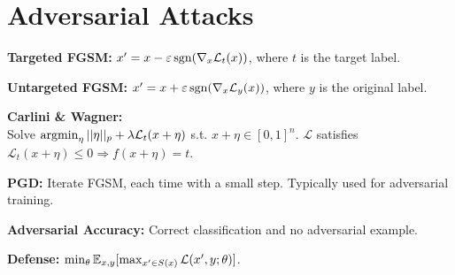 \section{Adversarial Attacks}
\textbf{Targeted FGSM:} $x^\prime = x - \varepsilon \operatorname{\operatorname{sgn}}(\nabla_x \mathcal{L}_t(x))$, where $t$ is the target label.

\textbf{Untargeted FGSM:} $x^\prime = x + \varepsilon \operatorname{\operatorname{sgn}}(\nabla_x \mathcal{L}_y (x))$, where $y$ is the original label.

\textbf{Carlini \& Wagner:}\\
Solve $\operatorname{\operatorname{argmin}}_\eta ||\eta||_p+\lambda \mathcal{L}_t(x+\eta)$ s.t. $x+\eta\in [0,1]^n$. $\mathcal{L}$ satisfies $\mathcal{L}_t(x+\eta)\le 0 \Rightarrow f(x+\eta)=t$.

\textbf{PGD:} Iterate FGSM, each time with a small step. Typically used for adversarial training.

\textbf{Adversarial Accuracy:} Correct classification and no adversarial example.

\textbf{Defense:} $\min_\theta \mathbb{E}_{x,y} [\max_{x^\prime\in S(x)} \mathcal{L}(x^\prime, y; \theta)]$.